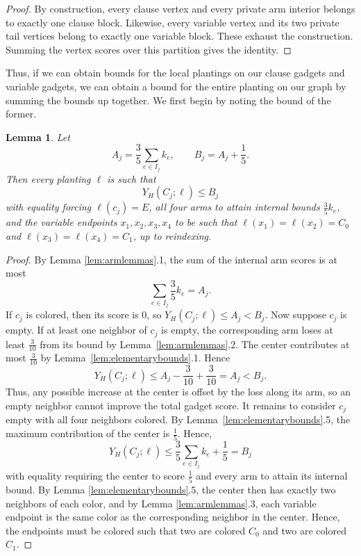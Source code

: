 \documentclass[11pt]{article}
\theoremstyle{plain}
\newtheorem{lemma}[theorem]{Lemma}
\begin{document}
\begin{proof}
    By construction, every clause vertex and every private arm interior belongs to exactly one clause block. Likewise, every variable vertex and its two private tail vertices belong to exactly one variable block. These exhaust the construction. Summing the vertex scores over this partition gives the identity.
\end{proof}

Thus, if we can obtain bounds for the local plantings on our clause gadgets and variable gadgets, we can obtain a bound for the entire planting on our graph by summing the bounds up together. We first begin by noting the bound of the former.

\begin{lemma} \label{lem:gadgetbound}
    Let 
    \[A_j = \frac{3}{5} \sum_{e \in I_j} k_e, \qquad B_j = A_j + \frac{1}{5}.\]
    Then every planting $\ell$ is such that
    \[Y_H(C_j; \ell) \leq B_j\]
    with equality forcing $\ell(c_j) = E$, all four arms to attain internal bounds $\frac{3}{5}k_e$, and the variable endpoints $x_1, x_2, x_3, x_4$ to be such that $\ell(x_1) = \ell (x_2) = C_0$ and $\ell(x_3) = \ell (x_4) = C_1$, up to reindexing.
\end{lemma}

\begin{proof}
    By Lemma \ref{lem:armlemmas}.1, the sum of the internal arm scores is at most
    \[
    \sum_{e\in I_j}\frac{3}{5}k_e=A_j.
    \] 
    If $c_j$ is colored, then its score is $0$, so $Y_H(C_j;\ell)\leq A_j<B_j$.
    Now suppose $c_j$ is empty. If at least one neighbor of $c_j$ is empty, the corresponding arm loses at least $\frac{3}{10}$ from its bound by Lemma~\ref{lem:armlemmas}.2. The center contributes at most $\frac{3}{10}$ by Lemma~\ref{lem:elementarybounds}.1. Hence
    \[
    Y_H(C_j;\ell)\leq A_j-\frac{3}{10}+\frac{3}{10}=A_j<B_j.
    \]
    Thus, any possible increase at the center is offset by the loss along its arm, so an empty neighbor cannot improve the total gadget score. It remains to consider $c_j$ empty with all four neighbors colored. By Lemma~\ref{lem:elementarybounds}.5, the maximum contribution of the center is $\frac15$. Hence,
    \[Y_H(C_j;\ell) \leq \frac{3}{5} \sum_{e \in I_j} k_e + \frac{1}{5} = B_j\]
    with equality requiring the center to score $\frac{1}{5}$ and every arm to attain its internal bound. By Lemma \ref{lem:elementarybounds}.5, the center then has exactly two neighbors of each color, and by Lemma \ref{lem:armlemmas}.3, each variable endpoint is the same color as the corresponding neighbor in the center. Hence, the endpoints must be colored such that two are colored $C_0$ and two are colored $C_1$.
\end{proof}
\end{document}

